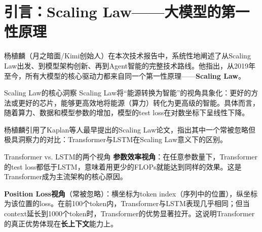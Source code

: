 \section{引言：Scaling Law——大模型的第一性原理}

杨植麟（月之暗面/Kimi创始人）在本次技术报告中，系统性地阐述了从Scaling Law出发、到模型架构创新、再到Agent智能的完整技术路线。他指出，从2019年至今，所有大模型的核心驱动力都来自同一个第一性原理——\textbf{Scaling Law}。

\begin{importantbox}{Scaling Law的核心洞察}
Scaling Law将``能源转换为智能''的视角具象化：更好的方法或更好的芯片，能够更高效地将能源（算力）转化为更高级的智能。具体而言，随着算力、数据和模型参数的增加，模型的test loss在对数坐标下呈线性下降。
\end{importantbox}

杨植麟引用了Kaplan等人最早提出的Scaling Law论文，指出其中一个常被忽略但极具洞察力的对比：Transformer与LSTM在Scaling Law意义下的区别。

\begin{knowledgebox}{Transformer vs. LSTM的两个视角}
\textbf{参数效率视角}：在任意参数量下，Transformer的test loss都低于LSTM，意味着用更少的FLOPs就能达到同样的效果。这是Transformer成为主流架构的核心原因。

\textbf{Position Loss视角}（常被忽略）：横坐标为token index（序列中的位置），纵坐标为该位置的loss。在前100个token内，Transformer与LSTM表现几乎相同；但当context延长到1000个token时，Transformer的优势显著拉开。这说明Transformer的真正优势体现在\textbf{长上下文}能力上。
\end{knowledgebox}


